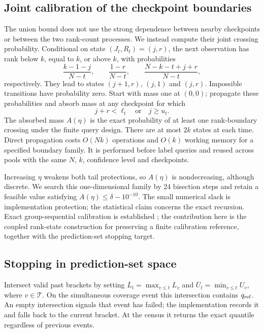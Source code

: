 \documentclass[pdflatex,sn-basic,Numbered,iicol]{sn-jnl}
\begin{document}
\subsection{Joint calibration of the checkpoint boundaries}\label{sec:joint}
The union bound does not use the strong dependence between nearby checkpoints or between the two rank-count processes. We instead compute their joint crossing probability. Conditional on state $(J_t,R_t)=(j,r)$, the next observation has rank below $k$, equal to $k$, or above $k$, with probabilities
\begin{equation}
 \frac{k-1-j}{N-t},\qquad
 \frac{1-r}{N-t},\qquad
 \frac{N-k-t+j+r}{N-t},
 \label{eq:transition}
\end{equation}
respectively. They lead to states $(j+1,r)$, $(j,1)$ and $(j,r)$. Impossible transitions have probability zero. Start with mass one at $(0,0)$; propagate these probabilities and absorb mass at any checkpoint for which
\begin{equation}
 j+r<\ell_t\quad\text{or}\quad j\ge u_t.
 \label{eq:crossing}
\end{equation}
The absorbed mass $A(\eta)$ is the exact probability of at least one rank-boundary crossing under the finite query design. There are at most $2k$ states at each time. Direct propagation costs $O(Nk)$ operations and $O(k)$ working memory for a specified boundary family. It is performed before label queries and reused across pools with the same $N$, $k$, confidence level and checkpoints.

Increasing $\eta$ weakens both tail protections, so $A(\eta)$ is nondecreasing, although discrete. We search this one-dimensional family by 24 bisection steps and retain a feasible value satisfying $A(\eta)\le\delta-10^{-10}$. The small numerical slack is implementation protection; the statistical claim concerns the exact recursion. Exact group-sequential calibration is established \cite{jin}; the contribution here is the coupled rank-state construction for preserving a finite calibration reference, together with the prediction-set stopping target.

\subsection{Stopping in prediction-set space}
Intersect valid past brackets by setting $\overline L_t=\max_{v\le t}L_v$ and $\overline U_t=\min_{v\le t}U_v$, where $v\in\mathcal T$. On the simultaneous coverage event this intersection contains $q_{\rm ref}$. An empty intersection signals that event has failed; the implementation records it and falls back to the current bracket. At the census it returns the exact quantile regardless of previous events.
\end{document}
